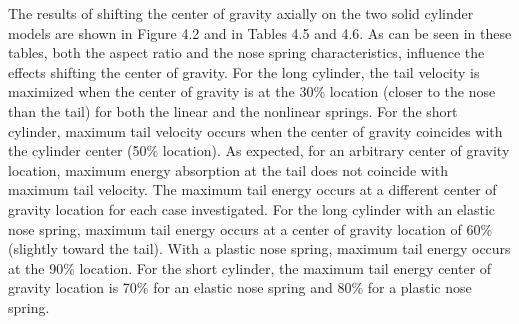      The results of shifting the center of gravity axially on the two
solid cylinder models are shown in Figure 4.2 and in
Tables 4.5 and 4.6.  As can be seen
in these tables, both the aspect ratio and the nose spring
characteristics, influence
the effects shifting the center of gravity.
For the long cylinder, the tail velocity is
maximized when the center of gravity is at the 30\% location (closer to
the nose than the tail) for both the linear and the nonlinear springs.
For the short cylinder, maximum tail velocity occurs when the
center of gravity
coincides with the cylinder center (50\% location). As
expected, for an arbitrary center of gravity location, maximum energy
absorption at the tail does not coincide with maximum tail
velocity.  The maximum tail energy occurs at a different
center of gravity
location for each case investigated.  For the long cylinder
with an elastic nose spring, maximum tail energy occurs at a
center of gravity
location of 60\% (slightly toward the tail).  With a plastic
nose spring, maximum tail energy occurs at the 90\% location. For the
short cylinder, the maximum tail energy center of gravity location is
70\% for an elastic nose spring and 80\% for a plastic nose spring.

